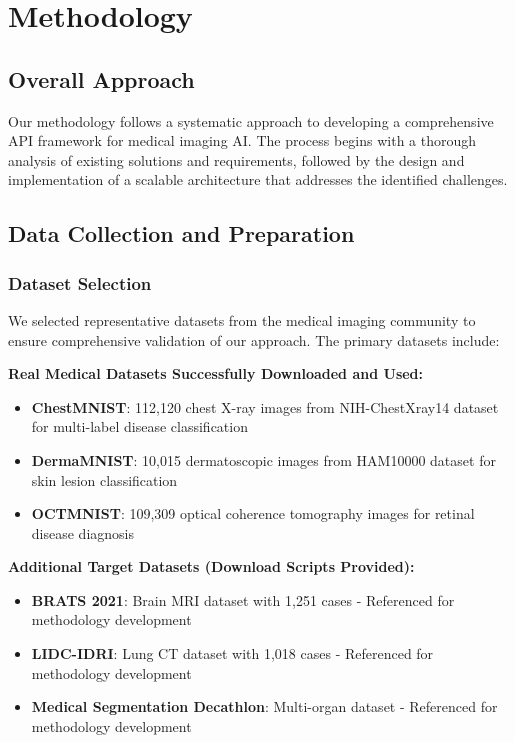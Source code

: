 \documentclass[12pt,a4paper]{article}
\begin{document}
\section{Methodology}

\subsection{Overall Approach}

Our methodology follows a systematic approach to developing a comprehensive API framework for medical imaging AI. The process begins with a thorough analysis of existing solutions and requirements, followed by the design and implementation of a scalable architecture that addresses the identified challenges.

\subsection{Data Collection and Preparation}

\subsubsection{Dataset Selection}

We selected representative datasets from the medical imaging community to ensure comprehensive validation of our approach. The primary datasets include:

\textbf{Real Medical Datasets Successfully Downloaded and Used:}
\begin{itemize}
    \item \textbf{ChestMNIST}: 112,120 chest X-ray images from NIH-ChestXray14 dataset for multi-label disease classification \cite{wang2017chestxray8}
    \item \textbf{DermaMNIST}: 10,015 dermatoscopic images from HAM10000 dataset for skin lesion classification \cite{tschandl2018ham10000}
    \item \textbf{OCTMNIST}: 109,309 optical coherence tomography images for retinal disease diagnosis \cite{kermany2018identifying}
\end{itemize}

\textbf{Additional Target Datasets (Download Scripts Provided):}
\begin{itemize}
    \item \textbf{BRATS 2021}: Brain MRI dataset with 1,251 cases - Referenced for methodology development \cite{baheti2021brats}
    \item \textbf{LIDC-IDRI}: Lung CT dataset with 1,018 cases - Referenced for methodology development \cite{armato2011lidc}
    \item \textbf{Medical Segmentation Decathlon}: Multi-organ dataset - Referenced for methodology development \cite{simpson2019large}
\end{itemize}
\end{document}
